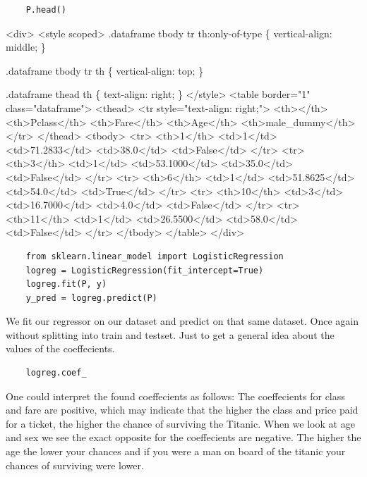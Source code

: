 \documentclass[11pt]{article}
\begin{document}
\begin{verbatim}
    P.head()
\end{verbatim}

\begin{HTML}
<div>
<style scoped>
    .dataframe tbody tr th:only-of-type \{
	vertical-align: middle;
    \}

.dataframe tbody tr th \{
    vertical-align: top;
\}

    .dataframe thead th \{
	text-align: right;
    \}
</style>
<table border="1" class="dataframe">
  <thead>
    <tr style="text-align: right;">
      <th></th>
      <th>Pclass</th>
      <th>Fare</th>
      <th>Age</th>
      <th>male\_dummy</th>
    </tr>
  </thead>
  <tbody>
    <tr>
      <th>1</th>
      <td>1</td>
      <td>71.2833</td>
      <td>38.0</td>
      <td>False</td>
    </tr>
    <tr>
      <th>3</th>
      <td>1</td>
      <td>53.1000</td>
      <td>35.0</td>
      <td>False</td>
    </tr>
    <tr>
      <th>6</th>
      <td>1</td>
      <td>51.8625</td>
      <td>54.0</td>
      <td>True</td>
    </tr>
    <tr>
      <th>10</th>
      <td>3</td>
      <td>16.7000</td>
      <td>4.0</td>
      <td>False</td>
    </tr>
    <tr>
      <th>11</th>
      <td>1</td>
      <td>26.5500</td>
      <td>58.0</td>
      <td>False</td>
    </tr>
  </tbody>
</table>
</div>
\end{HTML}

\begin{verbatim}
    from sklearn.linear_model import LogisticRegression
    logreg = LogisticRegression(fit_intercept=True)
    logreg.fit(P, y)
    y_pred = logreg.predict(P)
\end{verbatim}

We fit our regressor on our dataset and predict on that same dataset.
Once again without splitting into train and testset. Just to get a
general idea about the values of the coeffecients.

\begin{verbatim}
    logreg.coef_
\end{verbatim}

One could interpret the found coeffecients as follows: The coeffecients
for class and fare are positive, which may indicate that the higher the
class and price paid for a ticket, the higher the chance of surviving
the Titanic. When we look at age and sex we see the exact opposite for
the coeffecients are negative. The higher the age the lower your chances
and if you were a man on board of the titanic your chances of surviving
were lower.
\end{document}
